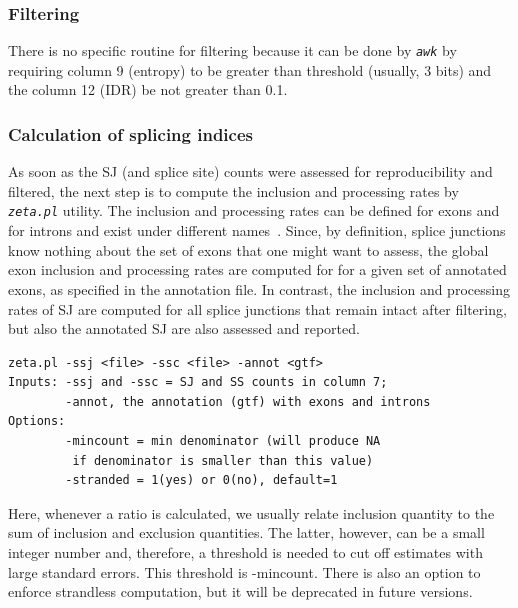 \documentclass{article}
\newcommand{\prog}[1]{{\tt\em #1}}
\begin{document}

\subsubsection{Filtering}

There is no specific routine for filtering because it can be done by \prog{awk} by requiring column 9 (entropy)
to be greater than threshold (usually, 3 bits) and the column 12 (IDR) be not greater than 0.1.


\subsubsection{Calculation of splicing indices}
As soon as the SJ (and splice site) counts were assessed for reproducibility and filtered, the next step is to compute the inclusion and processing rates by \prog{zeta.pl} utility.
The inclusion and processing rates can be defined for exons and for introns and exist under different names~\cite{pmid23172860}. Since, by definition, splice junctions 
know nothing about the set of exons that one might want to assess, the  global exon inclusion and processing rates are computed for for a given set of 
annotated exons, as specified in the annotation file. In contrast, the inclusion and processing rates of SJ are computed for all splice junctions that remain
intact after filtering, but also the annotated SJ are also assessed and reported.

\begin{verbatim}
zeta.pl -ssj <file> -ssc <file> -annot <gtf>
Inputs:	-ssj and -ssc = SJ and SS counts in column 7;
        -annot, the annotation (gtf) with exons and introns
Options:
        -mincount = min denominator (will produce NA 
         if denominator is smaller than this value)
        -stranded = 1(yes) or 0(no), default=1
\end{verbatim}
Here, whenever a ratio is calculated, we usually relate inclusion quantity to the sum of inclusion and exclusion quantities. The latter, however, can be a 
small integer number and, therefore, a threshold is needed to cut off estimates with large standard errors. This threshold is -mincount. There is also an option 
to enforce strandless computation, but it will be deprecated in future versions.
\end{document}
